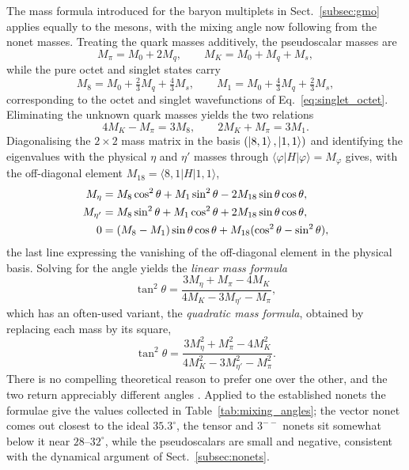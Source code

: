 The mass formula introduced for the baryon multiplets in
Sect.~\ref{subsec:gmo} applies equally to the mesons, with the mixing angle now
following from the nonet masses. Treating the quark masses additively, the
pseudoscalar masses are
\begin{equation}
    M_\pi = M_0 + 2M_q,
    \qquad
    M_K = M_0 + M_q + M_s,
    \label{eq:gmo_piK}
\end{equation}
while the pure octet and singlet states carry
\begin{equation}
    M_8 = M_0 + \tfrac{2}{3}M_q + \tfrac{4}{3}M_s,
    \qquad
    M_1 = M_0 + \tfrac{4}{3}M_q + \tfrac{2}{3}M_s,
    \label{eq:gmo_18}
\end{equation}
corresponding to the octet and singlet wavefunctions of
Eq.~\eqref{eq:singlet_octet}. Eliminating the unknown quark masses yields the two
relations
\begin{equation}
    4M_K - M_\pi = 3M_8,
    \qquad
    2M_K + M_\pi = 3M_1.
    \label{eq:gmo_relations}
\end{equation}
Diagonalising the $2\times2$ mass matrix in the basis $(\ket{8,1}, \ket{1,1})$ and
identifying the eigenvalues with the physical $\eta$ and $\eta'$ masses through
$\langle\varphi|H|\varphi\rangle = M_\varphi$ gives, with the off-diagonal element
$M_{18} = \langle 8,1|H|1,1\rangle$,
\begin{align}
    M_\eta   &= M_8\cos^2\theta + M_1\sin^2\theta - 2M_{18}\sin\theta\cos\theta,
    \notag\\
    M_{\eta'} &= M_8\sin^2\theta + M_1\cos^2\theta + 2M_{18}\sin\theta\cos\theta,
    \notag\\
    0 &= (M_8 - M_1)\sin\theta\cos\theta + M_{18}(\cos^2\theta - \sin^2\theta),
    \label{eq:gmo_matrix}
\end{align}
the last line expressing the vanishing of the off-diagonal element in the physical
basis. Solving for the angle yields the \emph{linear mass formula}
\begin{equation}
    \tan^2\theta =
    \frac{3M_\eta + M_\pi - 4M_K}{4M_K - 3M_{\eta'} - M_\pi},
    \label{eq:gmo_linear}
\end{equation}
which has an often-used variant, the \emph{quadratic mass formula}, obtained by
replacing each mass by its square,
\begin{equation}
    \tan^2\theta =
    \frac{3M_\eta^2 + M_\pi^2 - 4M_K^2}{4M_K^2 - 3M_{\eta'}^2 - M_\pi^2}.
    \label{eq:gmo_quadratic}
\end{equation}
There is no compelling theoretical reason to prefer one over the other, and the two
return appreciably different angles \cite[Ch.~5]{Amsler2018}. Applied to the
established nonets the formulae give the values collected in
Table~\ref{tab:mixing_angles}; the vector nonet comes out closest to the ideal
$35.3^\circ$, the tensor and $3^{--}$ nonets sit somewhat below it near
$28$--$32^\circ$, while the pseudoscalars are small and negative, consistent
with the dynamical argument of Sect.~\ref{subsec:nonets}.

